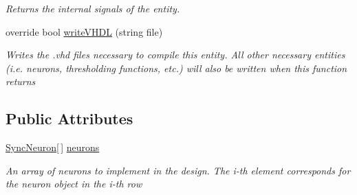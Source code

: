 \begin{DoxyCompactItemize}
\begin{DoxyCompactList}\small\item\em Returns the internal signals of the entity. \end{DoxyCompactList}\item 
override bool \hyperlink{class_n_n_gen_1_1_sync_neural_network_ab236b9511b805fa1cabe60f3a2c871d6}{write\+V\+H\+D\+L} (string file)
\begin{DoxyCompactList}\small\item\em Writes the .vhd files necessary to compile this entity. All other necessary entities (i.\+e. neurons, thresholding functions, etc.) will also be written when this function returns \end{DoxyCompactList}\end{DoxyCompactItemize}
\subsection*{Public Attributes}
\begin{DoxyCompactItemize}
\item 
\hyperlink{class_n_n_gen_1_1_sync_neuron}{Sync\+Neuron}\mbox{[}$\,$\mbox{]} \hyperlink{class_n_n_gen_1_1_sync_neural_network_a6358777de50d4b9fafde5b88bc9b96f7}{neurons}
\begin{DoxyCompactList}\small\item\em An array of neurons to implement in the design. The i-\/th element corresponds for the neuron object in the i-\/th row \end{DoxyCompactList}\end{DoxyCompactItemize}
